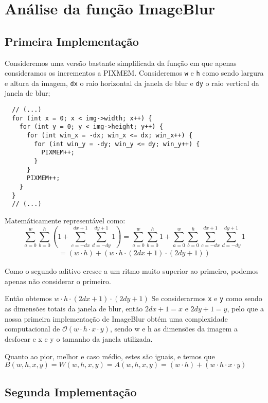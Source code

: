 \chapter[ImageBlur]{Análise da função ImageBlur}

\section{Primeira Implementação}
Consideremos uma versão bastante simplificada da função em que apenas consideramos os incrementos a PIXMEM. Consideremos
\verb|w| e \verb|h| como sendo largura e altura da imagem,
\verb|dx| o raio horizontal da janela de blur e \verb|dy| o
raio vertical da janela de blur;
\begin{listing}[H]
	\centering
	\begin{verbatim}
  // (...) 
  for (int x = 0; x < img->width; x++) {
    for (int y = 0; y < img->height; y++) {
      for (int win_x = -dx; win_x <= dx; win_x++) {
        for (int win_y = -dy; win_y <= dy; win_y++) {
          PIXMEM++;
        }
      }
      PIXMEM++;
    }
  }
  // (...)
\end{verbatim}
\end{listing}

Matemáticamente representável como:
\\
\begin{equation}
	\sum_{a=0}^{w}\sum_{b=0}^{h} (1 + \sum_{c=-dx}^{dx+1}\sum_{d=-dy}^{dy+1} 1)
	= \sum_{a=0}^{w}\sum_{b=0}^{h} 1 +
	\sum_{a=0}^{w}\sum_{b=0}^{h}
	\sum_{c=-dx}^{dx+1}\sum_{d=-dy}^{dy+1} 1
\end{equation}
\begin{align*}
	= (w \cdot h) + (w \cdot h \cdot (2dx + 1) \cdot (2dy + 1))
\end{align*}

Como o segundo aditivo cresce a um ritmo muito superior ao
primeiro, podemos apenas não considerar o primeiro.

Então obtemos $w\cdot h \cdot (2dx + 1) \cdot (2dy + 1)$
Se considerarmos \verb|x| e \verb|y| como sendo as dimensões totais da janela de blur, então $2dx + 1 = x$ e $2dy + 1 = y$,
pelo que a nossa primeira implementação de ImageBlur obtém
uma complexidade computacional de $\mathcal{O}(w\cdot h\cdot
	x\cdot y)$, sendo w e h as dimensões da imagem a desfocar e
x e y o tamanho da janela utilizada.

Quanto ao pior, melhor e caso médio, estes são iguais, e temos que $B(w,h,x,y) = W(w,h,x,y) = A(w,h,x,y) =
(w \cdot h) + (w \cdot h \cdot x \cdot y)$



\section{Segunda Implementação}
